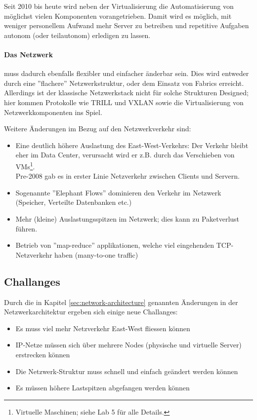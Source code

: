 Seit 2010 bis heute wird neben der Virtualisierung die Automatisierung von möglichst vielen Komponenten vorangetrieben. Damit wird es möglich, mit weniger personellem Aufwand mehr Server zu betreiben und repetitive Aufgaben autonom (oder teilautonom) erledigen zu lassen.

\paragraph{Das Netzwerk} muss dadurch ebenfalls flexibler und einfacher änderbar sein. Dies wird entweder durch eine ''flachere'' Netzwerkstruktur, oder dem Einsatz von Fabrics erreicht. Allerdings ist der klassische Netzwerkstack nicht für solche Strukturen Designed; hier kommen Protokolle wie TRILL und VXLAN sowie die Virtualisierung von Netzwerkkomponenten ins Spiel.

Weitere Änderungen im Bezug auf den Netzwerkverkehr sind: 
\begin{itemize}
	\item Eine deutlich höhere Auslastung des East-West-Verkehrs: Der Verkehr bleibt eher im Data Center, verursacht wird er z.B. durch das Verschieben von VMs\footnote{Virtuelle Maschinen; siehe Lab 5 für alle Details.}. \hfill \\
		 Pre-2008 gab es in erster Linie Netzverkehr zwischen Clients und Servern.
	\item Sogenannte ''Elephant Flows'' dominieren den Verkehr im Netzwerk (Speicher, Verteilte Datenbanken etc.)
	\item Mehr (kleine) Auslastungsspitzen im Netzwerk; dies kann zu Paketverlust führen.
	\item Betrieb von ''map-reduce'' applikationen, welche viel eingehenden TCP-Netzverkehr haben (many-to-one traffic)
\end{itemize}


\subsection{Challanges}

Durch die in Kapitel \ref{sec:network-architecture} genannten Änderungen in der Netzwerkarchitektur ergeben sich einige neue Challanges:
\begin{itemize}
	\item Es muss viel mehr Netzverkehr East-West fliessen können
	\item IP-Netze müssen sich über mehrere Nodes (physische und virtuelle Server) erstrecken können
	\item Die Netzwerk-Struktur muss schnell und einfach geändert werden können
	\item Es müssen höhere Lastspitzen abgefangen werden können
\end{itemize}

